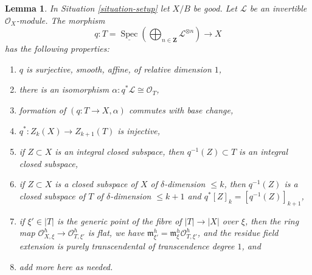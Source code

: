 \documentclass{stacks-project}
\theoremstyle{plain}
\newtheorem{lemma}[subsection]{Lemma}
\theoremstyle{definition}
\theoremstyle{remark}
\numberwithin{equation}{subsection}
\def\Spec{\mathop{\mathrm{Spec}}}
\begin{document}
\begin{lemma}
\label{lemma-Gm-torsor}
In Situation \ref{situation-setup} let $X/B$ be good.
Let $\mathcal{L}$ be an invertible $\mathcal{O}_X$-module.
The morphism
$$
q :
T = \underline{\Spec}\left(
\bigoplus\nolimits_{n \in \mathbf{Z}} \mathcal{L}^{\otimes n}\right)
\longrightarrow
X
$$
has the following properties:
\begin{enumerate}
\item $q$ is surjective, smooth, affine, of relative dimension $1$,
\item there is an isomorphism $\alpha : q^*\mathcal{L} \cong \mathcal{O}_T$,
\item formation of $(q : T \to X, \alpha)$ commutes with base change,
\item $q^* : Z_k(X) \to Z_{k + 1}(T)$ is injective,
\item if $Z \subset X$ is an integral closed subspace, then
$q^{-1}(Z) \subset T$ is an integral closed subspace,
\item if $Z \subset X$ is a closed subspace of $X$
of $\delta$-dimension $\leq k$, then $q^{-1}(Z)$ is a closed subspace of $T$
of $\delta$-dimension $\leq k + 1$ and
$q^*[Z]_k = [q^{-1}(Z)]_{k + 1}$,
\item if $\xi' \in |T|$ is the generic point of the fibre of $|T| \to |X|$
over $\xi$, then the ring map
$\mathcal{O}_{X, \xi}^h \to \mathcal{O}_{T, \xi'}^h$ is flat,
we have $\mathfrak m_{\xi'}^h = \mathfrak m_\xi^h \mathcal{O}_{T, \xi'}^h$, and
the residue field extension is purely transcendental of
transcendence degree $1$, and
\item add more here as needed.
\end{enumerate}
\end{lemma}
\end{document}
